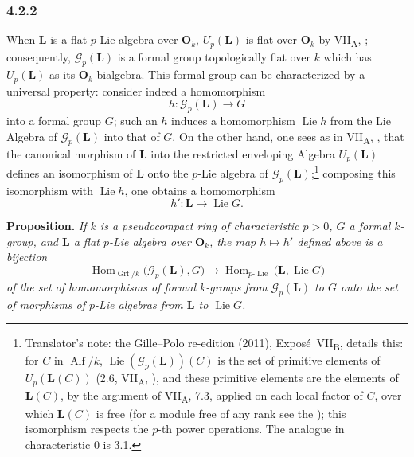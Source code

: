 
\subsubsection*{4.2.2}
\label{sga3:VIIB:4.2.2}

When \(\mathbf L\) is a flat \(p\)-Lie algebra over \(\mathbf O_k\),
\(U_p(\mathbf L)\) is flat over \(\mathbf O_k\) by
VII\textsubscript{A}, ; consequently,
\(\mathscr G_p(\mathbf L)\) is a formal group topologically flat over
\(k\) which has \(U_p(\mathbf L)\) as its \(\mathbf O_k\)-bialgebra.
This formal group can be characterized by a universal property:
consider indeed a homomorphism
\[
  h:\mathscr G_p(\mathbf L)\longrightarrow G
\]
into a formal group \(G\); such an \(h\) induces a homomorphism
\(\operatorname{Lie}h\) from the Lie Algebra of
\(\mathscr G_p(\mathbf L)\) into that of \(G\). On the other hand, one
sees as in VII\textsubscript{A}, , that the canonical morphism of
\(\mathbf L\) into the restricted enveloping Algebra
\(U_p(\mathbf L)\) defines an isomorphism of \(\mathbf L\) onto the
\(p\)-Lie algebra of \(\mathscr G_p(\mathbf L)\);\footnote{Translator's note: the Gille--Polo
re-edition (2011), Expos\'e~VII\textsubscript{B}, details this: for \(C\) in \(\operatorname{Alf}/k\),
\(\operatorname{Lie}(\mathscr G_p(\mathbf L))(C)\) is the set of primitive elements of
\(U_p(\mathbf L(C))\) (2.6, VII\textsubscript{A}, ), and these primitive elements are
the elements of \(\mathbf L(C)\), by the argument of VII\textsubscript{A}, 7.3, applied on each local factor of
\(C\), over which \(\mathbf L(C)\) is free (for a module free of any rank see the
); this isomorphism respects the
\(p\)-th power operations. The analogue in characteristic \(0\) is 3.1.} composing this
isomorphism with \(\operatorname{Lie}h\), one obtains a homomorphism
\[
  h':\mathbf L\longrightarrow\operatorname{Lie}G.
\]

\medskip
\noindent\textbf{Proposition.}
\label{sga3:VIIB:4.2.2:universal-property}
{\itshape If \(k\) is a pseudocompact ring of characteristic
\(p>0\), \(G\) a formal \(k\)-group, and \(\mathbf L\) a flat
\(p\)-Lie algebra over \(\mathbf O_k\), the map \(h\mapsto h'\)
defined above is a bijection
\[
  \operatorname{Hom}_{\operatorname{Grf}/k}
    \bigl(\mathscr G_p(\mathbf L),G\bigr)
  \longrightarrow
  \operatorname{Hom}_{p\text{-}\operatorname{Lie}}
    \bigl(\mathbf L,\operatorname{Lie}G\bigr)
\]
of the set of homomorphisms of formal \(k\)-groups from
\(\mathscr G_p(\mathbf L)\) to \(G\) onto the set of morphisms of
\(p\)-Lie algebras from \(\mathbf L\) to \(\operatorname{Lie}G\).}

